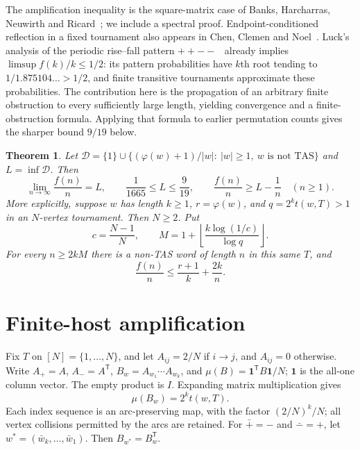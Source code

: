 \documentclass[11pt]{article}
\newtheorem{theorem}{Theorem}
\newcommand{\ph}{\varphi}
\begin{document}
The amplification inequality is the square-matrix case of Banks, Harcharras,
Neuwirth and Ricard~\cite[Theorem 1.1]{BHNR}; we include a spectral proof.
Endpoint-conditioned reflection in a fixed tournament also appears in
Chen, Clemen and Noel~\cite[Lemma 3.1]{CCN}.
Luck's analysis of the periodic rise--fall pattern $++--$~\cite[Section 8.2]{Luck}
already implies $\limsup f(k)/k\leq1/2$: its pattern probabilities have
$k$th root tending to $1/1.875104\ldots>1/2$, and finite transitive
tournaments approximate these probabilities. The contribution here is the
propagation of an arbitrary finite obstruction to every sufficiently large
length, yielding convergence and a finite-obstruction formula. Applying that
formula to earlier permutation counts gives the sharper bound $9/19$ below.

\begin{theorem}\label{thm:main}
Let $\mathcal D=\{1\}\cup\{(\ph(w)+1)/|w|:\ |w|\geq1,\ w\text{ is not TAS}\}$
and $L=\inf\mathcal D$. Then
\[
 \lim_{n\to\infty}\frac{f(n)}n=L,
 \qquad \frac1{1665}\leq L\leq\frac9{19},
 \qquad \frac{f(n)}n\geq L-\frac1n\quad(n\geq1).
\]
More explicitly, suppose $w$ has length $k\geq1$, $r=\ph(w)$, and
$q=2^kt(w,T)>1$ in an $N$-vertex tournament. Then $N\geq2$. Put
\begin{equation}\label{eq:cutoff}
 c=\frac{N-1}{N},\qquad
 M=1+\left\lfloor\frac{k\log(1/c)}{\log q}\right\rfloor.
\end{equation}
For every $n\geq2kM$ there is a non-TAS word of length $n$ in this same $T$, and
\begin{equation}\label{eq:upper}
 \frac{f(n)}n\leq\frac{r+1}{k}+\frac{2k}{n}.
\end{equation}
\end{theorem}

\section{Finite-host amplification}
Fix $T$ on $[N]=\{1,\ldots,N\}$, and let $A_{ij}=2/N$ if $i\to j$,
and $A_{ij}=0$ otherwise. Write $A_+=A$, $A_-=A^{\mathsf T}$,
$B_w=A_{w_1}\cdots A_{w_k}$, and
$\mu(B)=\mathbf1^{\mathsf T}B\mathbf1/N$; $\mathbf1$ is the all-one column
vector. The empty product is $I$. Expanding matrix multiplication gives
\begin{equation}\label{eq:mass}
 \mu(B_w)=2^kt(w,T).
\end{equation}
Each index sequence is an arc-preserving map, with the factor $(2/N)^k/N$;
all vertex collisions permitted by the arcs are retained.
For $\bar +=-$ and $\bar -=+$, let
$w^*=(\bar w_k,\ldots,\bar w_1)$. Then $B_{w^*}=B_w^{\mathsf T}$.
\end{document}

